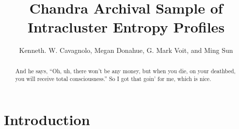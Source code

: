 \documentclass{emulateapj}
\begin{document}
\title{Chandra Archival Sample of Intracluster Entropy Profiles}
\author{Kenneth. W. Cavagnolo, Megan Donahue, G. Mark
  Voit, and Ming Sun}


\begin{abstract}
And he says, ``Oh, uh, there won't be any money, but when you die, on
your deathbed, you will receive total consciousness.'' So I got that
goin' for me, which is nice.
\end{abstract}



\section{Introduction}
\label{sec:intro}
\end{document}
